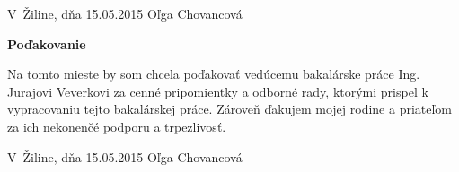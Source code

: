 \vspace{2em}

\noindent
V~Žiline, dňa 15.05.2015
\hfill
Oľga Chovancová

\newpage


\newpage

\centerline{\bf Poďakovanie}
\vspace{2em}
\noindent
Na tomto mieste by som chcela poďakovať vedúcemu bakalárske práce Ing. Jurajovi Veverkovi za cenné pripomientky a odborné rady, ktorými prispel k vypracovaniu tejto bakalárskej práce. Zároveň ďakujem mojej rodine a priateľom za ich nekonenčé podporu a trpezlivosť. 

\vspace{2em}

\noindent
V~Žiline, dňa 15.05.2015
\hfill
Oľga Chovancová



%

